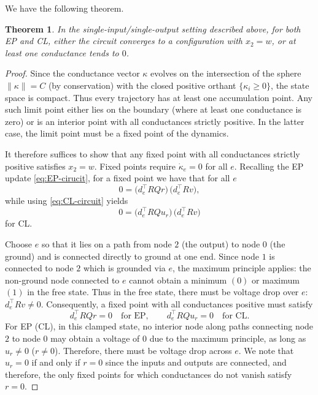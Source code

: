 \documentclass[final, 11pt, nonatbib]{elsarticle}
\theoremstyle{definition}
\theoremstyle{plain}
\newtheorem{theorem}[definition]{Theorem}
\numberwithin{equation}{section}
\begin{document}
We have the following theorem.

\begin{theorem}
    In the single-input/single-output setting described above, for both EP and
    CL, either the circuit converges to a configuration with $x_2 = w$, or at
    least one conductance tends to $0$.
    \label{Lemma:converge}
\end{theorem}

\begin{proof}
Since the conductance vector $\kappa$ evolves on the intersection of the sphere
$\|\kappa\| = C$ (by conservation) with the closed positive orthant
$\{\kappa_i \ge 0\}$, the state space is compact.  Thus every trajectory has at
least one accumulation point.  Any such limit point either lies on the boundary
(where at least one conductance is zero) or is an interior point with all
conductances strictly positive.  In the latter case, the limit point must be a
fixed point of the dynamics.

It therefore suffices to show that any fixed point with all conductances
strictly positive satisfies $x_2 = w$.  Fixed points require
$\dot{\kappa}_e = 0$ for all $e$.  Recalling the EP update \eqref{eq:EP-cirucit}, for a fixed point we have that for all $e$
\begin{equation}
 0 = \bigl(d_e^\top RQ r\bigr)\,
                     \bigl(d_e^\top R v\bigr),
\end{equation}
while using \eqref{eq:CL-circuit} yields
\begin{equation}
    0 = \bigl(d_e^\top RQ u_r\bigr)\,
                     \bigl(d_e^\top R v\bigr)
\end{equation}
for CL.

Choose $e$ so that it lies on a path from node $2$ (the output) to
node $0$ (the ground) and is connected directly to ground at one end. Since node $1$ is connected to node $2$ which is grounded via $e$, the maximum principle applies: the non-ground node connected to $e$ cannot obtain a minimum $(0)$ or maximum $(1)$ in the free state. Thus in the free state, there must be voltage drop over $e$:
$d_e^\top R v \neq 0$. Consequently, a fixed point with all
conductances positive must satisfy
\[
    d_e^\top RQ r = 0 \quad\text{for EP}, \qquad
    d_e^\top RQ u_r = 0 \quad\text{for CL}.
\]
For EP (CL), in this clamped state, no interior node along paths connecting node $2$ to node $0$ may obtain a voltage of $0$ due to the maximum principle, as long as $u_r \neq 0$ ($r \neq 0$). Therefore, there must be voltage drop across $e$. We note that $u_r =0$ if and only if $r = 0$ since the inputs and outputs are connected, and therefore, the only fixed points for which conductances do not vanish satisfy $r =0.$

\end{proof}
\end{document}
